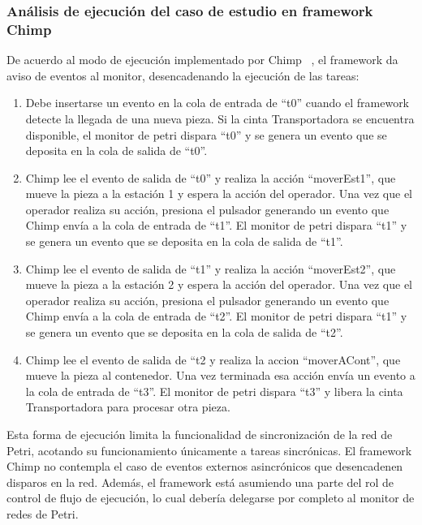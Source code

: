 \subsubsection{Análisis de ejecución del caso de estudio en framework Chimp} 
De acuerdo al modo de ejecución implementado por Chimp ~\cite{chimp}, el
framework da aviso de eventos al monitor, desencadenando la ejecución de las tareas:
\begin{enumerate}
    \item Debe insertarse un evento en la cola de entrada de “t0” cuando el framework
		detecte la llegada de una nueva pieza. Si la cinta Transportadora se encuentra
		disponible, el monitor de petri dispara “t0” y se genera un evento que se
		deposita en la cola de salida de “t0”.
    \item Chimp lee el evento de salida de “t0” y realiza la acción “moverEst1”, que
		mueve la pieza a la estación 1 y espera la acción del operador. Una vez que el
		operador realiza su acción, presiona el pulsador generando un evento que Chimp
		envía a la cola de  entrada de “t1”. El monitor de petri dispara “t1” y se
		genera un evento que se deposita en la cola de salida de “t1”.
    \item Chimp lee el evento de salida de “t1” y realiza la acción “moverEst2”, que
		mueve la pieza a la estación 2 y espera la acción del operador. Una vez que el
		operador realiza su acción, presiona el pulsador generando un evento que Chimp
		envía a la cola de  entrada de “t2”. El monitor de petri dispara “t1” y se
		genera un evento que se deposita en la cola de salida de “t2”.
    \item Chimp lee el evento de salida de “t2 y realiza la accion “moverACont”, que
		mueve la pieza al contenedor. Una vez terminada esa acción envía un evento a
		la cola de entrada de “t3”. El monitor de petri dispara “t3” y libera la
		cinta Transportadora para procesar otra pieza.
\end{enumerate}

Esta forma de ejecución limita la funcionalidad de sincronización de la red de
Petri, acotando su funcionamiento únicamente a tareas sincrónicas. El
framework Chimp no contempla el caso de eventos externos asincrónicos que
desencadenen disparos en la red. Además, el framework está asumiendo una parte
del rol de control de flujo de ejecución, lo cual debería delegarse por completo
al monitor de redes de Petri.

